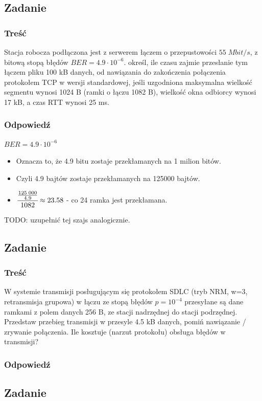 	\subsection{Zadanie}
		\subsubsection{Treść}
			Stacja robocza podłączona jest z serwerem łączem o przepustowości $ 55\;Mbit/s $, z bitową stopą błędów $ BER=4.9\cdot 10^{-6} $. określ, ile czasu zajmie przesłanie tym łączem pliku 100 kB danych, od nawiązania do zakończenia połączenia protokołem TCP w wersji standardowej, jeśli uzgodniona maksymalna wielkość segmentu wynosi 1024 B (ramki o łączu 1082 B), wielkość okna odbiorcy wynosi 17 kB, a czas RTT wynosi 25 ms.
		\subsubsection{Odpowiedź}
			$ BER=4.9\cdot 10^{-6} $
			\begin{itemize}
				\item Oznacza to, że 4.9 bitu zostaje przekłamanych na 1 milion bitów.
				\item Czyli 4.9 bajtów zostaje przekłamanych na 125000 bajtów.
				\item $ \cfrac{\frac{125\;000}{4.9}}{1082}\approx 23.58 $ - co 24 ramka jest przekłamana.
			\end{itemize}
			TODO: uzupełnić tej szajs analogicznie.
	\subsection{Zadanie}
		\subsubsection{Treść}
			W systemie transmisji posługującym się protokołem SDLC (tryb NRM, w=3, retransmisja grupowa) w łączu ze stopą błędów $ p=10^{-4} $ przesyłane są dane ramkami z polem danych 256 B, ze stacji nadrzędnej do stacji podrzędnej. Przedstaw przebieg transmisji w przesyle 4.5 kB danych, pomiń nawiązanie / zrywanie połączenia. Ile kosztuje (narzut protokołu) obsługa błędów w transmisji?
		\subsubsection{Odpowiedź}
	\subsection{Zadanie}
